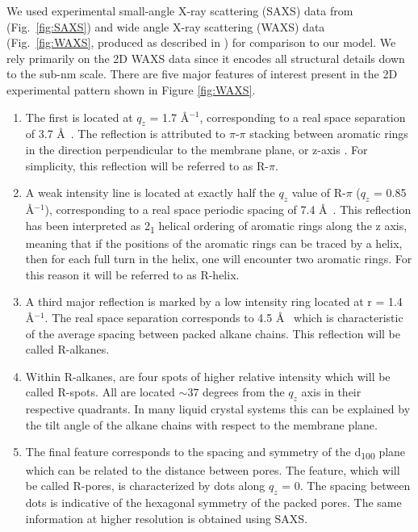 \documentclass{article}
\newcommand{\angstrom}{\textup{\AA}}
\begin{document}
  We used experimental small-angle X-ray scattering (SAXS) data from
  \cite{feng_thin_2016} (Fig.~\ref{fig:SAXS}) and wide angle X-ray scattering
  (WAXS) data (Fig.~\ref{fig:WAXS}, produced as described in
  \cite{feng_scalable_2014}) for comparison to our model. We rely primarily on the 2D WAXS data
  since it encodes all structural details down to the sub-nm scale.  There are
  five major features of interest present in the 2D experimental pattern shown in
  Figure \ref{fig:WAXS}.

  \begin{enumerate} 
  
  	\item The first is located at $q_z$ = 1.7 \angstrom$^{-1}$, corresponding to
	a real space separation of 3.7 \angstrom~.  The reflection is attributed to
	$\pi$-$\pi$ stacking between aromatic rings in the direction perpendicular to
	the membrane plane, or z-axis \cite{feng_scalable_2014}. For simplicity, this
	reflection will be referred to as R-$\pi$.
 
  	\item A weak intensity line is located at exactly half the $q_z$ value of
	R-$\pi$ ($q_z$ = 0.85 \angstrom$^{-1}$), corresponding to a real space periodic
	spacing of 7.4 \angstrom~. This reflection has been interpreted as
	2\textsubscript{1} helical ordering of aromatic rings along the z axis, meaning
	that if the positions of the aromatic rings can be traced by a helix, then for
	each full turn in the helix, one will encounter two aromatic rings. For this
	reason it will be referred to as R-helix. 

	\item A third major reflection is marked by a low intensity ring
	located at r = 1.4 \angstrom$^{-1}$. The real space separation corresponds to
	4.5 \angstrom~ which is characteristic of the average spacing between packed
	alkane chains.  This reflection will be called R-alkanes.

	\item Within R-alkanes, are four spots of higher relative intensity
	which will be called R-spots. All are located $\sim 37$ degrees from the $q_z$
	axis in their respective quadrants. In many liquid crystal systems this can be
	explained by the tilt angle of the alkane chains with respect to the membrane
	plane.
 
	\item The final feature corresponds to the spacing and symmetry of the
	d\textsubscript{100} plane which can be related to the distance between pores.
	The feature, which will be called R-pores, is characterized by dots along $q_z$
	= 0. The spacing between dots is indicative of the hexagonal symmetry of the
	packed pores. The same information at higher resolution is obtained using SAXS. 

  \end{enumerate}
\end{document}
